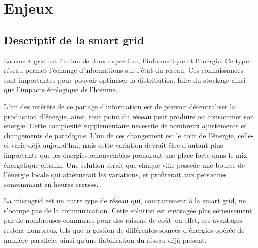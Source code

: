 \chapter{Enjeux}
\section{Descriptif de la smart grid}


La smart grid est l'union de deux expertises, l'informatique et l'énergie.
Ce type réseau permet l'échange d'informations sur l'état du réseau.
Ces connaissances sont importantes pour pouvoir optimiser la distribution, faire du stockage 
ainsi que l'impacte écologique de l'homme.

L'un des intérêts de ce partage d'information est de pouvoir décentraliser la production d'énergie,
ainsi, tout point du réseau peut produire ou consommer son energie.
Cette complexité supplémentaire nécessite de nombreux ajustements et changements de paradigme.
L'un de ces changement est le coût de l'énergie, celle-ci varie déjà aujourd’hui, mais cette variation
devrait être d'autant plus importante que les énergies renouvelables prendront une place forte dans
le mix énergétique citadin. Une solution serait que chaque ville possède une bourse de l'énergie
locale qui atténuerait les variations, et profiterait aux personnes consommant en heures creuses.


La microgrid est un autre type de réseau qui, contrairement à la smart grid, ne s'occupe pas de la communication.
Cette solution est envisagée plus sérieusement par de nombreuses communes pour des raisons de coût, en effet, ses
avantages restent nombreux tels que la gestion de différentes sources d'énergies opérée de manière parallèle,
ainsi qu'une fiabilisation du réseau déjà présent.



